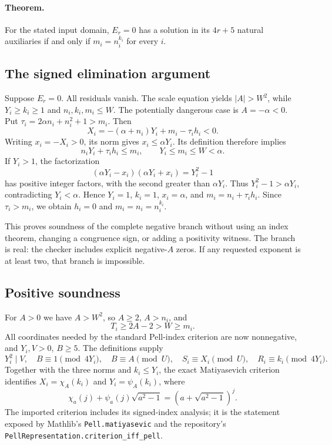 \paragraph{Theorem.}
For the stated input domain, $E_r=0$ has a solution in its $4r+5$ natural
auxiliaries if and only if $m_i=n_i^{k_i}$ for every $i$.

\subsection{The signed elimination argument}
Suppose $E_r=0$. All residuals vanish. The scale equation yields
$|A|>W^2$, while $Y_i\geq k_i\geq1$ and $n_i,k_i,m_i\leq W$.
The potentially dangerous case is $A=-\alpha<0$. Put
$\tau_i=2\alpha n_i+n_i^2+1>m_i$. Then
\[
X_i=-(\alpha+n_i)Y_i+m_i-\tau_i h_i<0.
\]
Writing $x_i=-X_i>0$, its norm gives $x_i\leq\alpha Y_i$. Its definition
therefore implies
\[
n_iY_i+\tau_i h_i\leq m_i,\qquad Y_i\leq m_i\leq W<\alpha.
\]
If $Y_i>1$, the factorization
\[
(\alpha Y_i-x_i)(\alpha Y_i+x_i)=Y_i^2-1
\]
has positive integer factors, with the second greater than $\alpha Y_i$.
Thus $Y_i^2-1>\alpha Y_i$, contradicting $Y_i<\alpha$. Hence $Y_i=1$,
$k_i=1$, $x_i=\alpha$, and $m_i=n_i+\tau_i h_i$. Since $\tau_i>m_i$,
we obtain $h_i=0$ and $m_i=n_i=n_i^{k_i}$.

This proves soundness of the complete negative branch without using an
index theorem, changing a congruence sign, or adding a positivity witness.
The branch is real: the checker includes explicit negative-$A$ zeros.
If any requested exponent is at least two, that branch is impossible.

\subsection{Positive soundness}
For $A>0$ we have $A>W^2$, so $A\geq2$, $A>n_i$, and
\[
T_i\geq2A-2>W\geq m_i.
\]
All coordinates needed by the standard Pell-index criterion are now
nonnegative, and $Y_i,V>0$, $B\geq5$. The definitions supply
\[
Y_i^2\mid V,\quad B\equiv1\pmod{4Y_i},\quad B\equiv A\pmod U,
\quad S_i\equiv X_i\pmod U,\quad R_i\equiv k_i\pmod{4Y_i}.
\]
Together with the three norms and $k_i\leq Y_i$, the exact
Matiyasevich criterion identifies
$X_i=\chi_A(k_i)$ and $Y_i=\psi_A(k_i)$, where
\[
\chi_a(j)+\psi_a(j)\sqrt{a^2-1}=(a+\sqrt{a^2-1})^j.
\]
The imported criterion includes its signed-index analysis; it is the
statement exposed by Mathlib's \texttt{Pell.matiyasevic} and the repository's
\texttt{PellRepresentation.criterion\_iff\_pell}.

